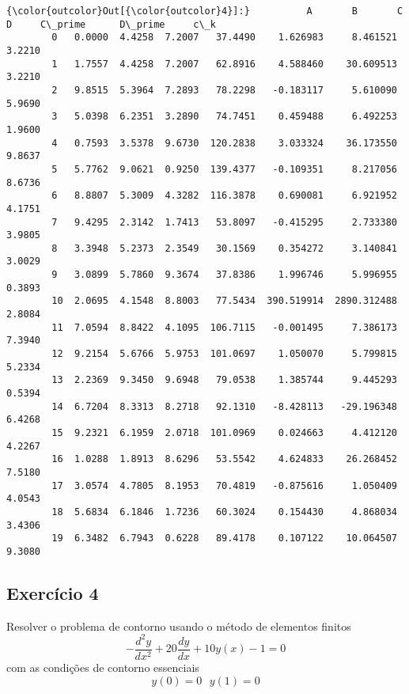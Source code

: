 \documentclass[11pt]{article}
\begin{document}
\begin{Verbatim}[commandchars=\\\{\}]
{\color{outcolor}Out[{\color{outcolor}4}]:}          A       B       C         D     C\_prime      D\_prime     c\_k
        0   0.0000  4.4258  7.2007   37.4490    1.626983     8.461521  3.2210
        1   1.7557  4.4258  7.2007   62.8916    4.588460    30.609513  3.2210
        2   9.8515  5.3964  7.2893   78.2298   -0.183117     5.610090  5.9690
        3   5.0398  6.2351  3.2890   74.7451    0.459488     6.492253  1.9600
        4   0.7593  3.5378  9.6730  120.2838    3.033324    36.173550  9.8637
        5   5.7762  9.0621  0.9250  139.4377   -0.109351     8.217056  8.6736
        6   8.8807  5.3009  4.3282  116.3878    0.690081     6.921952  4.1751
        7   9.4295  2.3142  1.7413   53.8097   -0.415295     2.733380  3.9805
        8   3.3948  5.2373  2.3549   30.1569    0.354272     3.140841  3.0029
        9   3.0899  5.7860  9.3674   37.8386    1.996746     5.996955  0.3893
        10  2.0695  4.1548  8.8003   77.5434  390.519914  2890.312488  2.8084
        11  7.0594  8.8422  4.1095  106.7115   -0.001495     7.386173  7.3940
        12  9.2154  5.6766  5.9753  101.0697    1.050070     5.799815  5.2334
        13  2.2369  9.3450  9.6948   79.0538    1.385744     9.445293  0.5394
        14  6.7204  8.3313  8.2718   92.1310   -8.428113   -29.196348  6.4268
        15  9.2321  6.1959  2.0718  101.0969    0.024663     4.412120  4.2267
        16  1.0288  1.8913  8.6296   53.5542    4.624833    26.268452  7.5180
        17  3.0574  4.7805  8.1953   70.4819   -0.875616     1.050409  4.0543
        18  5.6834  6.1846  1.7236   60.3024    0.154430     4.868034  3.4306
        19  6.3482  6.7943  0.6228   89.4178    0.107122    10.064507  9.3080
\end{Verbatim}
            
    \hypertarget{exercuxedcio-4}{%
\subsection{Exercício 4}\label{exercuxedcio-4}}

Resolver o problema de contorno usando o método de elementos finitos
\[ -\frac{d^2 y}{d x^2} + 20 \frac{dy}{dx} + 10 y(x)-1=0 \] com as
condições de contorno essenciais \[y(0)=0 \:\:\: y(1)=0\]
\end{document}
